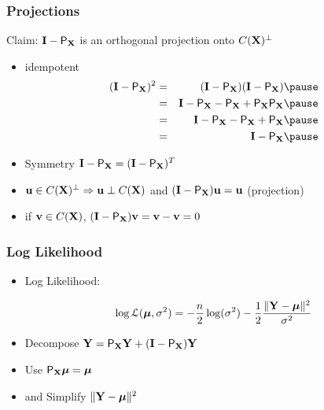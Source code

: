 \documentclass{beamer}
\begin{document}
\begin{frame} \frametitle{Projections}
  Claim: $\mathbf{I} - \textsf{P}_{\mathbf{X}}$ is an orthogonal projection onto $C(\mathbf{X})^{\perp}$ \pause
  \begin{itemize}
  \item idempotent  \pause
    \begin{eqnarray*}
(\I - \P_{\X})^2 &= & (\I - \P_\X)(\I - \P_\X)  \pause \\
& = & \I - \P_\X - \P_\X + \P_\X \P_\X       \pause \\
& = & \I - \P_\X -\P_\X + \P_\X  \pause\\
& = & \I - \P_\X  \pause
    \end{eqnarray*}
\item Symmetry $\mathbf{I} - \textsf{P}_{\mathbf{X}} = (\mathbf{I} - \textsf{P}_{\mathbf{X}})^T$  \pause
\item $\mathbf{u} \in C(\mathbf{X})^{\perp} \Rightarrow \mathbf{u} \perp C(\mathbf{X})$ and  $(\mathbf{I}
  -\textsf{P}_{\mathbf{X}}) \mathbf{u}  = \mathbf{u}$  (projection)  \pause
\item if $\mathbf{v} \in C(\mathbf{X})$, $(\mathbf{I} - \textsf{P}_{\mathbf{X}} ) \mathbf{v} = \mathbf{v} - \mathbf{v} = 0$ 
  \end{itemize}
\end{frame}


\begin{frame}
  \frametitle{Log Likelihood}
  \begin{itemize}
\item Log Likelihood:  \pause

$$ \log {\cal{L}}(\boldsymbol{\mu}, \sigma^2) =
-\frac{n}{2} \log(\sigma^2) 
  - \frac 1 2 \frac{\| \mathbf{Y} - \boldsymbol{\mu} \|^2}{\sigma^2} 
$$  \pause
\item Decompose $\mathbf{Y} = \textsf{P}_{\mathbf{X}} \mathbf{Y} + (\mathbf{I} - \textsf{P}_{\mathbf{X}}) \mathbf{Y}$  \pause
\item Use $\textsf{P}_{\mathbf{X}} \boldsymbol{\mu} = \boldsymbol{\mu}$  \pause
\item and Simplify $\| \mathbf{Y} - \boldsymbol{\mu} \|^2$
  \end{itemize}

\end{frame}
\end{document}
